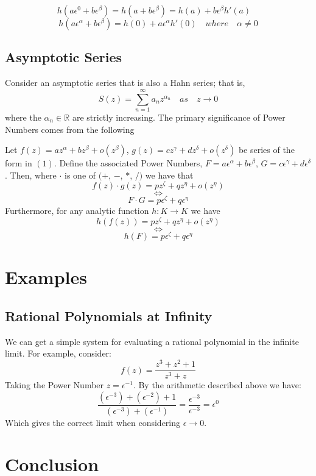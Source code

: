 \documentclass[acmsmall]{acmart}
\begin{document}
$$h(a\epsilon^0+b\epsilon^\beta) = h(a+b\epsilon^\beta) = h(a) + b\epsilon^\beta h'(a) \quad$$
$$h(a\epsilon^\alpha+b\epsilon^\beta) = h(0) + a\epsilon^\alpha h'(0) \quad where \quad \alpha \neq 0$$

\subsection{Asymptotic Series}

Consider an asymptotic series that is also a Hahn series; that is,
\begin{equation}
S(z) = \sum_{n=1}^{\infty}a_nz^{\alpha_n} \quad as \quad z \rightarrow 0
\end{equation}
where the $\alpha_n \in \mathbb{R}$ are strictly increasing.
The primary significance of Power Numbers comes from the following 
\begin{proposition}
	Let $f(z) = az^\alpha + bz^\beta + o(z^\beta)$,	$g(z) = cz^\gamma + dz^\delta + o(z^\delta)$ be series of the form in $(1)$.
	Define the associated Power Numbers, $F = a\epsilon^\alpha + b\epsilon^\beta$, $G = c\epsilon^\gamma + d\epsilon^\delta$.
	Then, where $\cdot$ is one of $(+$, $-$, $*$, $/)$ we have that 
	$$f(z) \cdot g(z) = pz^\zeta + qz^\eta + o(z^\eta)$$
	$$\Leftrightarrow$$
	$$F \cdot G = p\epsilon^\zeta + q\epsilon^\eta$$
	Furthermore, for any analytic function $h:K \rightarrow K$ we have
	$$h(f(z)) = pz^\zeta + qz^\eta + o(z^\eta)$$ 
	$$\Leftrightarrow$$
	$$h(F) = p\epsilon^\zeta + q\epsilon^\eta$$
\end{proposition}

\section{Examples}

\subsection{Rational Polynomials at Infinity}
We can get a simple system for evaluating a rational polynomial in the infinite limit. For example, consider:
$$f(z) = \frac{z^3+z^2+1}{z^3+z}$$
Taking the Power Number $z = \epsilon^{-1}$. By the arithmetic described above we have:
$$\frac{(\epsilon^{-3})+(\epsilon^{-2})+1}{(\epsilon^{-3})+(\epsilon^{-1})} = \frac{\epsilon^{-3}}{\epsilon^{-3}}=\epsilon^0$$
Which gives the correct limit when considering $\epsilon \rightarrow 0$.


\section{Conclusion}
\end{document}
